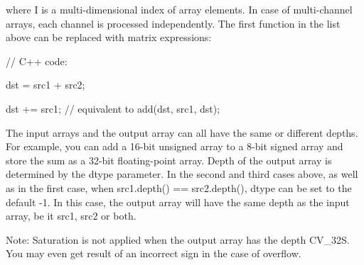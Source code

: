 where {\ttfamily I} is a multi-\/dimensional index of array elements. In case of multi-\/channel arrays, each channel is processed independently. The first function in the list above can be replaced with matrix expressions\+: {\ttfamily }

{\ttfamily }

{\ttfamily }

{\ttfamily // C++ code\+:}

{\ttfamily }

{\ttfamily }

{\ttfamily dst = src1 + src2;}

{\ttfamily }

{\ttfamily }

{\ttfamily dst += src1; // equivalent to add(dst, src1, dst);}

{\ttfamily }

{\ttfamily }

{\ttfamily The input arrays and the output array can all have the same or different depths. For example, you can add a 16-\/bit unsigned array to a 8-\/bit signed array and store the sum as a 32-\/bit floating-\/point array. Depth of the output array is determined by the {\ttfamily dtype} parameter. In the second and third cases above, as well as in the first case, when {\ttfamily src1.\+depth() == src2.\+depth()}, {\ttfamily dtype} can be set to the default {\ttfamily -\/1}. In this case, the output array will have the same depth as the input array, be it {\ttfamily src1}, {\ttfamily src2} or both. }

Note\+: Saturation is not applied when the output array has the depth {\ttfamily C\+V\+\_\+32S}. You may even get result of an incorrect sign in the case of overflow.


